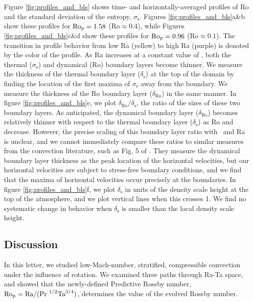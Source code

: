 Figure \ref{fig:profiles_and_bls} shows time- and horizontally-averaged profiles of
Ro and the standard deviation of the entropy, $\sigma_{\text{s}}$.
Figures \ref{fig:profiles_and_bls}a\&b show these profiles for $\text{Ro}_{\text{p}}=1.58$ ($\text{Ro} \approx 0.4$), while
Figures \ref{fig:profiles_and_bls}c\&d show these profiles for $\text{Ro}_{\text{p}}=0.96$ ($\text{Ro} \approx 0.1$). The transition
in profile behavior from low Ra (yellow) to high Ra (purple) is denoted by the color of the
profile.
As Ra increases at a constant value of
\pro, both the thermal ($\sigma_{\text{s}}$) and dynamical (Ro) boundary layers become thinner. 
We measure the
thickness of the thermal boundary layer ($\delta_{\text{s}}$) at the top of the domain by 
finding the location of the first maxima of $\sigma_{\text{s}}$ away from the boundary.
We measure
the thickness of the Ro boundary layer ($\delta_{\text{Ro}}$) 
in the same manner.
In figure \ref{fig:profiles_and_bls}e, we plot $\delta_{\text{Ro}}/\delta_{\text{s}}$, the ratio
of the sizes of these two boundary layers. As anticipated, the dynamical boundary layer ($\delta_{\text{Ro}}$)
becomes relatively thinner with respect to the thermal boundary layer ($\delta_{\text{s}}$)
as Ro and \pro$\,$ decrease. 
However, the precise scaling of this boundary layer ratio with \pro$\,$ and Ra is unclear, 
and we cannot immediately compare these ratios to similar measures from the \RB convection
literature, such as Fig. 5 of \cite{king&all2013}. They measure the dynamical boundary layer
thickness as the peak location of the horizontal velocities, but our horizontal velocities
are subject to stress-free boundary conditions, and we find that the maxima of horizontal 
velocities occur precisely at the boundaries.
In figure \ref{fig:profiles_and_bls}f, we plot $\delta_\text{s}$ in units of the density
scale height at the top of the atmosphere, and we plot vertical lines when this crosses 1.
We find no systematic change in behavior when $\delta_{\text{s}}$ is smaller than the
local density scale height.

\subsection{Discussion}
\label{sec:discussion}
In this letter, we studied low-Mach-number, stratified, compressible convection 
under the influence of rotation.
We examined three paths through Ra-Ta space, and showed that the newly-defined 
Predictive Rossby number, $\text{Ro}_{\text{p}} = \text{Ra}/(\text{Pr }^{1/2}\text{Ta}^{3/4})$, determines the value of
the evolved Rossby number. 

